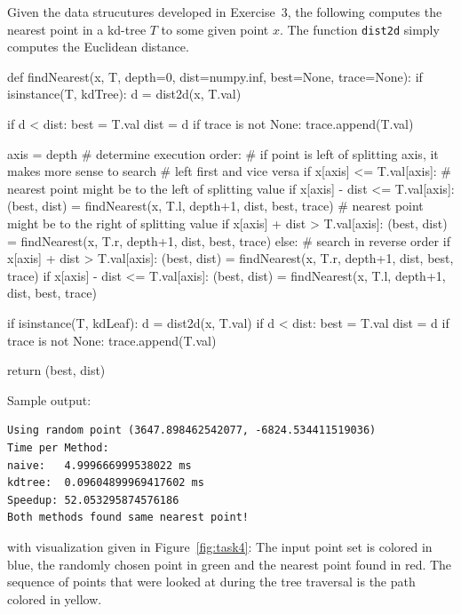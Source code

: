 \documentclass[english, fontsize=12pt, paper=a4, twoside=false, draft=true, pagesize=auto, version=last, DIV=16]{scrartcl}
\theoremstyle{break}
\begin{document}
Given the data strucutures developed in Exercise~3, the following computes the nearest
point in a kd-tree $T$ to some given point $x$. The function \texttt{dist2d} simply
computes the Euclidean distance.

\begin{python}
def findNearest(x, T, depth=0, dist=numpy.inf, best=None, trace=None):
    if isinstance(T, kdTree):
        d = dist2d(x, T.val)

        if d < dist:
            best = T.val
            dist = d
        if trace is not None:
            trace.append(T.val)

        axis = depth %
        # determine execution order:
        # if point is left of splitting axis, it makes more sense to search
        # left first and vice versa
        if x[axis] <= T.val[axis]:
            # nearest point might be to the left of splitting value
            if x[axis] - dist <= T.val[axis]:
                (best, dist) = findNearest(x, T.l, depth+1, dist, best, trace)
            # nearest point might be to the right of splitting value
            if x[axis] + dist  > T.val[axis]:
                (best, dist) = findNearest(x, T.r, depth+1, dist, best, trace)
        else:
            # search in reverse order
            if x[axis] + dist  > T.val[axis]:
                (best, dist) = findNearest(x, T.r, depth+1, dist, best, trace)
            if x[axis] - dist <= T.val[axis]:
                (best, dist) = findNearest(x, T.l, depth+1, dist, best, trace)

    if isinstance(T, kdLeaf):
        d = dist2d(x, T.val)
        if d < dist:
            best = T.val
            dist = d
        if trace is not None:
            trace.append(T.val)

    return (best, dist)
\end{python}

Sample output:

\begin{verbatim}
Using random point (3647.898462542077, -6824.534411519036)
Time per Method:
naive:   4.999666999538022 ms
kdtree:  0.09604899969417602 ms
Speedup: 52.053295874576186
Both methods found same nearest point!
\end{verbatim}

with visualization given in Figure~\ref{fig:task4}: The input point set is colored in
blue, the randomly chosen point in green and the nearest point found in red. The sequence
of points that were looked at during the tree traversal is the path colored in yellow.
\end{document}
